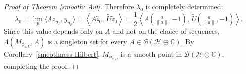 \documentclass[10pt,a4paper]{amsart}
\begin{document}
\begin{proof}[Proof of Theorem \ref{smooth: Aut}]
\noindent Therefore $\lambda_0$ is completely determined:
\[
\lambda_0 = \lim_p\langle Az_{n_p}, y_{n_p}\rangle 
= \left\langle A\tilde{z}_0,\ \widetilde{U}\tilde{z}_0\right\rangle
= \frac{1}{2}\left\langle A\!\left(\tfrac{a}{\|a\|}, -1\right),\ 
\widetilde{U}\!\left(\tfrac{a}{\|a\|}, -1\right)\right\rangle.
\]
Since this value depends only on $A$ and not on the choice of 
sequences, $\Lambda(M_{\phi_{a,U}}, A)$ is a singleton set for every 
$A \in \mathcal{B}(\mathcal{H} \oplus \mathbb{C})$. By 
Corollary~\ref{smoothness-Hilbert}, $M_{\phi_{a,U}}$ is a smooth point 
in $\mathcal{B}(\mathcal{H} \oplus \mathbb{C})$, completing the 
proof.
\end{proof}
\end{document}
